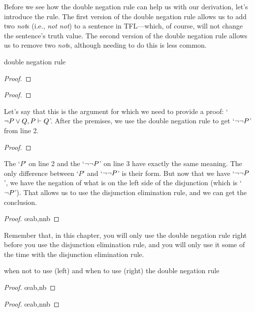 Before we see how the double negation rule can help us with our derivation, let's introduce the rule. The first version of the double negation rule allows us to add two \textit{not}s (i.e., \textit{not not}) to a sentence in TFL---which, of course, will not change the sentence's truth value. The second version of the double negation rule allows us to remove two \textit{not}s, although needing to do this is less common. 

\begin{factboxy-width}[width=7.5cm]{double negation rule}
\begin{proof}
	 
\end{proof}

\begin{proof}
	 
\end{proof}
\end{factboxy-width}

Let's say that this is the argument for which we need to provide a proof: `${\neg} P \vee Q, P \vdash Q$'. After the premises, we use the double negation rule to get `${\neg} {\neg} P$' from line 2.

\begin{proof}
	 \pr{}
	 \pr{} 
	 
\end{proof}
The `$P$' on line 2 and the `${\neg} {\neg} P$' on line 3 have exactly the same meaning. The only difference between `$P$' and `${\neg} {\neg} P$' is their form. But now that we have `${\neg} {\neg} P$', we have the negation of what is on the left side of the disjunction (which is `${\neg} P$'). That allows us to use the disjunction elimination rule, and we can get the conclusion.

\begin{proof}
	 \pr{}
	 \pr{}
	 
	 \oe{ab,nnb}
\end{proof}

Remember that, in this chapter, you will only use the double negation rule right before you use the disjunction elimination rule, and you will only use it some of the time with the disjunction elimination rule.

\begin{factboxy-side}{when not to use (left) and when to use (right) the double negation rule}\label{DN-box}
\begin{proof}
	 \oe{ab,nb}
\end{proof}
\tcblower
\begin{proof}
	 
	 \oe{ab,nnb}
\end{proof}
\end{factboxy-side}


